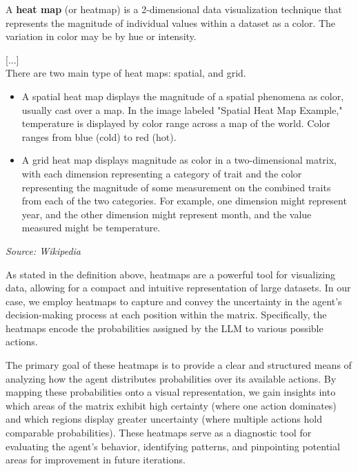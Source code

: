 \begin{blockquote}
  A \textbf{heat map} (or heatmap) is a 2-dimensional data visualization
  technique that represents the magnitude of individual values within a dataset
  as a color. The variation in color may be by hue or intensity.

  [...]\\There are two main type of heat maps: spatial, and grid.
  \begin{itemize}
    \item A spatial heat map displays the magnitude of a spatial phenomena as color,
      usually cast over a map. In the image labeled "Spatial Heat Map Example,"
      temperature is displayed by color range across a map of the world. Color ranges
      from blue (cold) to red (hot).

    \item A grid heat map displays magnitude as color in a two-dimensional matrix,
      with each dimension representing a category of trait and the color
      representing the magnitude of some measurement on the combined traits from
      each of the two categories. For example, one dimension might represent
      year, and the other dimension might represent month, and the value
      measured might be temperature.
  \end{itemize}
  \emph{Source: Wikipedia\footnotemark}
\end{blockquote}

As stated in the definition above, heatmaps are a powerful tool for visualizing
data, allowing for a compact and intuitive representation of large datasets. In
our case, we employ heatmaps to capture and convey the uncertainty in the agent's
decision-making process at each position within the matrix. Specifically, the heatmaps
encode the probabilities assigned by the LLM to various possible actions.

The primary goal of these heatmaps is to provide a clear and structured means of
analyzing how the agent distributes probabilities over its available actions. By
mapping these probabilities onto a visual representation, we gain insights into which
areas of the matrix exhibit high certainty (where one action dominates) and which
regions display greater uncertainty (where multiple actions hold comparable
probabilities). These heatmaps serve as a diagnostic tool for evaluating the
agent's behavior, identifying patterns, and pinpointing potential areas for
improvement in future iterations.

